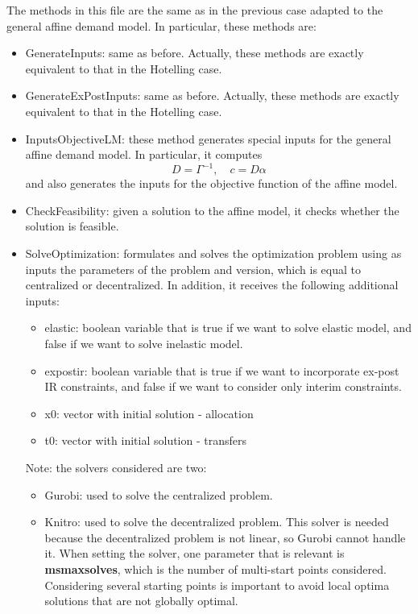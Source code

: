 \documentclass[11pt, oneside]{article}
\begin{document}
The methods in this file are the same as in the previous case adapted to the general affine demand model.
In particular, these methods are:
\begin{itemize}
  \item GenerateInputs: same as before. Actually, these methods are exactly equivalent to that in the Hotelling case.
  \item GenerateExPostInputs: same as before. Actually, these methods are exactly equivalent to that in the Hotelling case.
  \item InputsObjectiveLM: these method generates special inputs for the general affine demand model. In particular, it computes
  \[
  D = \Gamma^{-1}, \quad c = D \alpha
  \]
  and also generates the inputs for the objective function of the affine model.
  \item CheckFeasibility: given a solution to the affine model, it checks whether the solution is feasible.
  \item SolveOptimization: formulates and solves the optimization problem using as inputs the parameters of the problem and version, which is equal to centralized or decentralized.
  In addition, it receives the following additional inputs:
  \begin{itemize}
    \item elastic: boolean variable that is true if we want to solve elastic model, and false if we want to solve inelastic model.
    \item expostir: boolean variable that is true if we want to incorporate ex-post IR constraints, and false if we want to consider only interim constraints.
    \item x0: vector with initial solution - allocation
    \item t0: vector with initial solution - transfers
  \end{itemize}
  Note: the solvers considered are two:
  \begin{itemize}
    \item Gurobi: used to solve the centralized problem.
    \item Knitro: used to solve the decentralized problem. This solver is needed because the decentralized problem
    is not linear, so Gurobi cannot handle it. When setting the solver, one parameter that is relevant is
    \textbf{msmaxsolves}, which is the number of multi-start points considered.
    Considering several starting points is important to avoid local optima solutions
    that are not globally optimal.
  \end{itemize}

\end{itemize}
\end{document}
